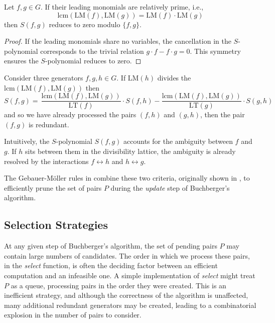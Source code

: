\begin{lemma}
\label{lem: product_criterion}
Let $f, g \in G$. If their leading monomials are relatively prime, i.e.,
$$ \text{lcm}(\text{LM}(f), \text{LM}(g)) = \text{LM}(f) \cdot \text{LM}(g) $$
then $S(f, g)$ reduces to zero modulo $\{f, g\}$.
\end{lemma}
\begin{proof}
If the leading monomials share no variables, the cancellation in the $S$-polynomial corresponds to the trivial relation $g \cdot f - f \cdot g = 0$. This symmetry ensures the $S$-polynomial reduces to zero.
\end{proof}

\begin{lemma}
\label{lem: chain_criterion}
Consider three generators $f, g, h \in G$. If $\text{LM}(h)$ divides the $\text{lcm}(\text{LM}(f), \text{LM}(g))$ then
$$
S(f, g) = \frac{}{}\frac{\text{lcm}(\text{LM}(f), \text{LM}(g))}{\text{LT}(f)} \cdot S(f, h) - \frac{\text{lcm}(\text{LM}(f), \text{LM}(g))}{\text{LT}(g)} \cdot S(g, h)
$$
and so we have already processed the pairs $(f, h)$ and $(g, h)$, then the pair $(f, g)$ is redundant.
\end{lemma}
Intuitively, the $S$-polynomial $S(f, g)$ accounts for the ambiguity between $f$ and $g$. If $h$ sits between them in the divisibility lattice, the ambiguity is already resolved by the interactions $f \leftrightarrow h$ and $h \leftrightarrow g$.

The Gebauer-Möller rules in \cite{Gebauer1988_InstallationOfGB} combine these two criteria, originally shown in \cite{Buchberger1985_AlgoMethod}, to efficiently prune the set of pairs $P$ during the \textit{update} step of Buchberger's algorithm.

\subsection{Selection Strategies}
\label{subsec:selection_strategies}

At any given step of Buchberger's algorithm, the set of pending pairs $P$ may contain large numbers of candidates. The order in which we process these pairs, in the \textit{select} function, is often the deciding factor between an efficient computation and an infeasible one. A simple implementation of \textit{select} might treat $P$ as a queue, processing pairs in the order they were created. This is an inefficient strategy, and although the correctness of the algorithm is unaffected, many additional redundant generators may be created, leading to a combinatorial explosion in the number of pairs to consider.

